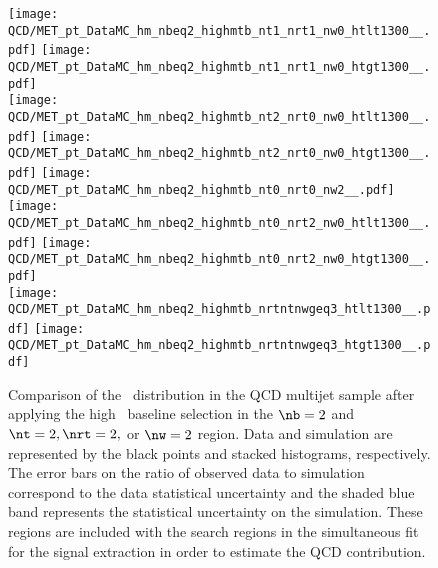 \begin{figure}[!htb]
	\begin{center}
  \texttt{[image: QCD/MET\_pt\_DataMC\_hm\_nbeq2\_highmtb\_nt1\_nrt1\_nw0\_htlt1300\_\_.pdf]}
  \texttt{[image: QCD/MET\_pt\_DataMC\_hm\_nbeq2\_highmtb\_nt1\_nrt1\_nw0\_htgt1300\_\_.pdf]} \\
  \texttt{[image: QCD/MET\_pt\_DataMC\_hm\_nbeq2\_highmtb\_nt2\_nrt0\_nw0\_htlt1300\_\_.pdf]}
  \texttt{[image: QCD/MET\_pt\_DataMC\_hm\_nbeq2\_highmtb\_nt2\_nrt0\_nw0\_htgt1300\_\_.pdf]} 
  \texttt{[image: QCD/MET\_pt\_DataMC\_hm\_nbeq2\_highmtb\_nt0\_nrt0\_nw2\_\_.pdf]} \\
  \texttt{[image: QCD/MET\_pt\_DataMC\_hm\_nbeq2\_highmtb\_nt0\_nrt2\_nw0\_htlt1300\_\_.pdf]}  
  \texttt{[image: QCD/MET\_pt\_DataMC\_hm\_nbeq2\_highmtb\_nt0\_nrt2\_nw0\_htgt1300\_\_.pdf]} \\
  \texttt{[image: QCD/MET\_pt\_DataMC\_hm\_nbeq2\_highmtb\_nrtntnwgeq3\_htlt1300\_\_.pdf]} 
  \texttt{[image: QCD/MET\_pt\_DataMC\_hm\_nbeq2\_highmtb\_nrtntnwgeq3\_htgt1300\_\_.pdf]} \\
	\end{center}
	\caption[QCD Multijet HM Control Region $\nb=2$ with 2 heavy objects]{Comparison of the \met~distribution in the QCD multijet sample after applying the high \dm~baseline selection in the $\nb=2$ and $\nt=2, \nrt=2,$ or $\nw=2$ region. Data and simulation are represented by the black points and stacked histograms, respectively. The error bars on the ratio of observed data to simulation correspond to the data statistical uncertainty and the shaded blue band represents the statistical uncertainty on the simulation. These regions are included with the search regions in the simultaneous fit for the signal extraction in order to estimate the QCD contribution.
	 }
	\label{fig:qcd-cr-datavsmc-hm-nb2-2}
\end{figure}

